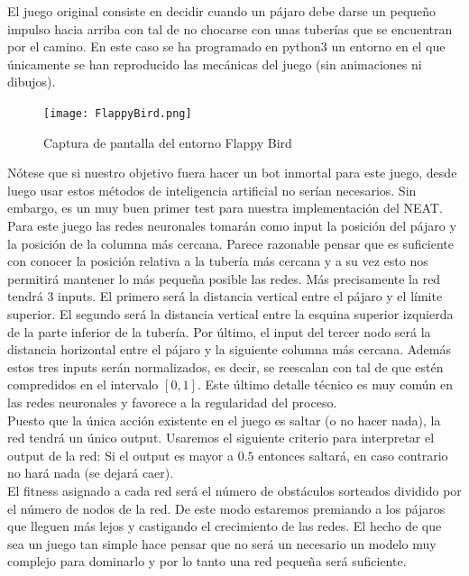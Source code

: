 \documentclass{article}
\begin{document}
El juego original consiste en decidir cuando un pájaro debe darse un pequeño impulso hacia arriba con tal de no chocarse con unas tuberías que se encuentran por el camino. En este caso se ha programado en python3 un entorno en el que únicamente se han reproducido las mecánicas del juego (sin animaciones ni dibujos).\\
\begin{figure}[htbp]
\centergin
\texttt{[image: FlappyBird.png]}
\caption{Captura de pantalla del entorno Flappy Bird}
\end{figure}



Nótese que si nuestro objetivo fuera hacer un bot inmortal para este juego, desde luego usar estos métodos de inteligencia artificial no serían necesarios. Sin embargo, es un muy buen primer test para nuestra implementación del NEAT.\\

Para este juego las redes neuronales tomarán como input la posición del pájaro y la posición de la columna más cercana. Parece razonable pensar que es suficiente con conocer la posición relativa a la tubería más cercana y a su vez esto nos permitirá mantener lo más pequeña posible las redes. Más precisamente la red tendrá 3 inputs. El primero será la distancia vertical entre el pájaro y el límite superior. El segundo será la distancia vertical entre la esquina superior izquierda de la parte inferior de la tubería. Por último, el input del tercer nodo será la distancia horizontal entre el pájaro y la siguiente columna más cercana. Además estos tres inputs serán normalizados, es decir, se reescalan con tal de que estén compredidos en el intervalo $[0,1]$. Este último detalle técnico es muy común en las redes neuronales y favorece a la regularidad del proceso.\\

Puesto que la única acción existente en el juego es saltar (o no hacer nada), la red tendrá un único output. Usaremos el siguiente criterio para interpretar el output de la red: Si el output es mayor a $0.5$ entonces saltará, en caso contrario no hará nada (se dejará caer).\\

El fitness asignado a cada red será el número de obstáculos sorteados dividido por el número de nodos de la red. De este modo estaremos premiando a los pájaros que lleguen más lejos y castigando el crecimiento de las redes. El hecho de que sea un juego tan simple hace pensar que no será un necesario un modelo muy complejo para dominarlo y por lo tanto una red pequeña será suficiente. \\
\end{document}

